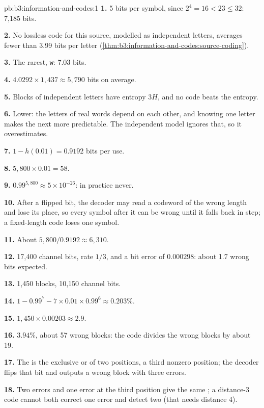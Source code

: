 \begin{solution}{pb:b3:information-and-codes:1}
\textbf{1.} 5 bits per symbol, since $2^4 = 16 < 23 \le 32$: 7,185 bits.

\textbf{2.} No lossless code for this source, modelled as independent letters, averages fewer than 3.99 bits per letter (\cref{thm:b3:information-and-codes:source-coding}).

\textbf{3.} The rarest, \texttt{w}: 7.03 bits.

\textbf{4.} $4.0292 \times 1{,}437 \approx 5{,}790$ bits on average.

\textbf{5.} Blocks of independent letters have entropy $3H$, and no code beats the entropy.

\textbf{6.} Lower: the letters of real words depend on each other, and knowing one letter makes the next more predictable. The independent model ignores that, so it overestimates.

\textbf{7.} $1 - h(0.01) = 0.9192$ bits per use.

\textbf{8.} $5{,}800 \times 0.01 = 58$.

\textbf{9.} $0.99^{5{,}800} \approx 5 \times 10^{-26}$: in practice never.

\textbf{10.} After a flipped bit, the decoder may read a codeword of the wrong length and lose its place, so every symbol after it can be wrong until it falls back in step; a fixed-length code loses one symbol.

\textbf{11.} About $5{,}800 / 0.9192 \approx 6{,}310$.

\textbf{12.} 17,400 channel bits, rate $1/3$, and a bit error of $0.000298$: about 1.7 wrong bits expected.

\textbf{13.} 1,450 blocks, 10,150 channel bits.

\textbf{14.} $1 - 0.99^7 - 7 \times 0.01 \times 0.99^6 \approx 0.203\%$.

\textbf{15.} $1{,}450 \times 0.00203 \approx 2.9$.

\textbf{16.} $3.94\%$, about 57 wrong blocks: the code divides the wrong blocks by about 19.

\textbf{17.} The  is the exclusive or of two positions, a third nonzero position; the decoder flips that bit and outputs a wrong block with three errors.

\textbf{18.} Two errors and one error at the third position give the same ; a distance-3 code cannot both correct one error and detect two (that needs distance 4).


\end{solution}
